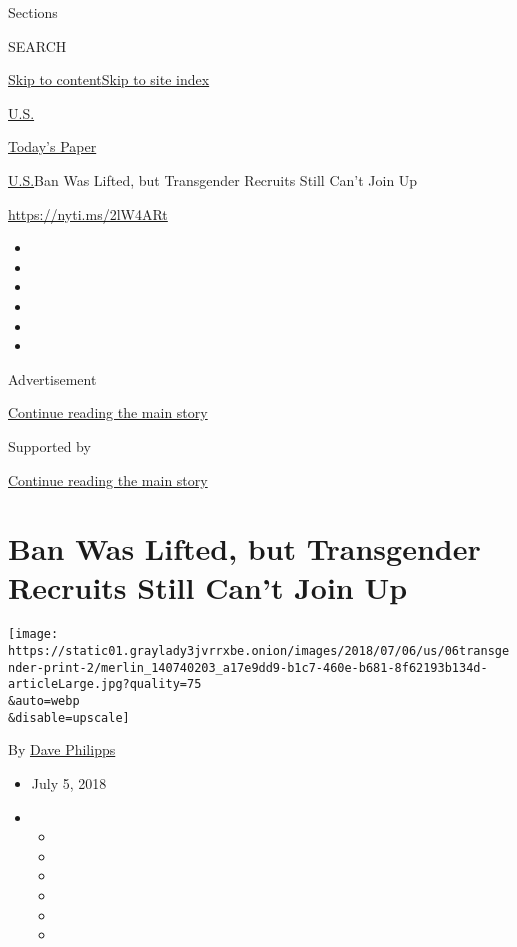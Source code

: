 Sections

SEARCH

\protect\hyperlink{site-content}{Skip to
content}\protect\hyperlink{site-index}{Skip to site index}

\href{https://www.nytimes3xbfgragh.onion/section/us}{U.S.}

\href{https://myaccount.nytimes3xbfgragh.onion/auth/login?response_type=cookie\&client_id=vi}{}

\href{https://www.nytimes3xbfgragh.onion/section/todayspaper}{Today's
Paper}

\href{/section/us}{U.S.}\textbar{}Ban Was Lifted, but Transgender
Recruits Still Can't Join Up

\url{https://nyti.ms/2lW4ARt}

\begin{itemize}
\item
\item
\item
\item
\item
\item
\end{itemize}

Advertisement

\protect\hyperlink{after-top}{Continue reading the main story}

Supported by

\protect\hyperlink{after-sponsor}{Continue reading the main story}

\hypertarget{ban-was-lifted-but-transgender-recruits-still-cant-join-up}{%
\section{Ban Was Lifted, but Transgender Recruits Still Can't Join
Up}\label{ban-was-lifted-but-transgender-recruits-still-cant-join-up}}

\texttt{[image: https://static01.graylady3jvrrxbe.onion/images/2018/07/06/us/06transgender-print-2/merlin\_140740203\_a17e9dd9-b1c7-460e-b681-8f62193b134d-articleLarge.jpg?quality=75\\\&auto=webp\\\&disable=upscale]}

By \href{http://www.nytimes3xbfgragh.onion/by/dave-philipps}{Dave
Philipps}

\begin{itemize}
\item
  July 5, 2018
\item
  \begin{itemize}
  \item
  \item
  \item
  \item
  \item
  \item
  \end{itemize}
\end{itemize}

